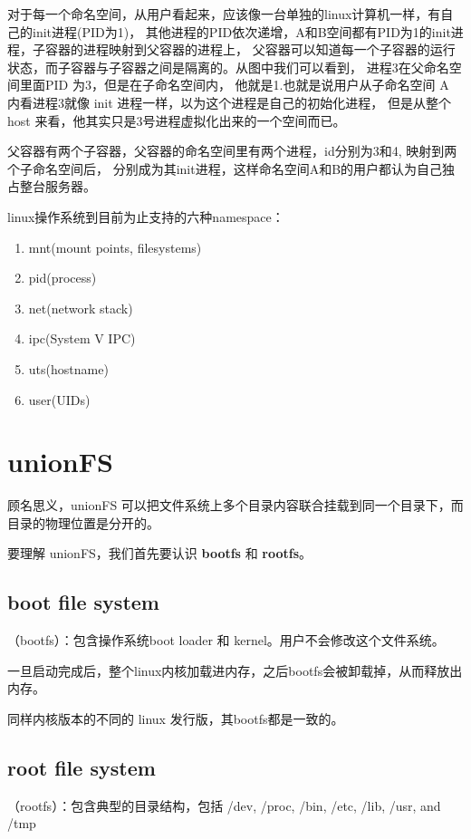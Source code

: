 对于每一个命名空间，从用户看起来，应该像一台单独的linux计算机一样，有自己的init进程(PID为1)，
其他进程的PID依次递增，A和B空间都有PID为1的init进程，子容器的进程映射到父容器的进程上，
父容器可以知道每一个子容器的运行状态，而子容器与子容器之间是隔离的。从图中我们可以看到，
进程3在父命名空间里面PID 为3，但是在子命名空间内，
他就是1.也就是说用户从子命名空间 A 内看进程3就像 init 进程一样，以为这个进程是自己的初始化进程，
但是从整个 host 来看，他其实只是3号进程虚拟化出来的一个空间而已。

父容器有两个子容器，父容器的命名空间里有两个进程，id分别为3和4, 映射到两个子命名空间后，
分别成为其init进程，这样命名空间A和B的用户都认为自己独占整台服务器。

linux操作系统到目前为止支持的六种namespace：
\begin{enumerate}
    \item mnt(mount points, filesystems)
    \item pid(process)
    \item net(network stack)
    \item ipc(System V IPC)
    \item uts(hostname)
    \item user(UIDs)
\end{enumerate}

\section{unionFS}

顾名思义，unionFS 可以把文件系统上多个目录内容联合挂载到同一个目录下，而目录的物理位置是分开的。

要理解 unionFS，我们首先要认识 \textbf{bootfs} 和 \textbf{rootfs}。

\subsection{ boot file system}

（bootfs）：包含操作系统boot loader 和 kernel。用户不会修改这个文件系统。

一旦启动完成后，整个linux内核加载进内存，之后bootfs会被卸载掉，从而释放出内存。

同样内核版本的不同的 linux 发行版，其bootfs都是一致的。

\subsection{root file system}

（rootfs）：包含典型的目录结构，包括 /dev, /proc, /bin, /etc, /lib, /usr, and /tmp


